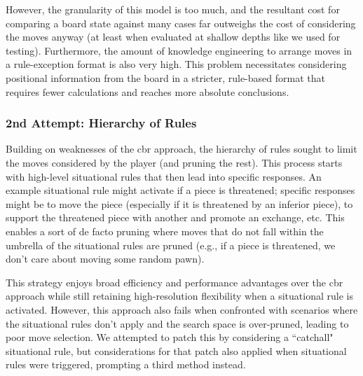 \documentclass[letterpaper]{article}
\begin{document}
However, the granularity of this model is too much, and the resultant cost for comparing a board state against many cases far outweighs the cost of considering the moves anyway (at least when evaluated at shallow depths like we used for testing).  Furthermore, the amount of knowledge engineering to arrange moves in a rule-exception format is also very high.  This problem necessitates considering positional information from the board in a stricter, rule-based format that requires fewer calculations and reaches more absolute conclusions.

\subsubsection{2nd Attempt: Hierarchy of Rules}
Building on weaknesses of the \acrshort{cbr} approach, the hierarchy of rules sought to limit the moves considered by the player (and pruning the rest).  This process starts with high-level situational rules that then lead into specific responses.  An example situational rule might activate if a piece is threatened; specific responses might be to move the piece (especially if it is threatened by an inferior piece), to support the threatened piece with another and promote an exchange, etc.  This enables a sort of de facto pruning where moves that do not fall within the umbrella of the situational rules are pruned (e.g., if a piece is threatened, we don't care about moving some random pawn).

This strategy enjoys broad efficiency and performance advantages over the \acrshort{cbr} approach while still retaining high-resolution flexibility when a situational rule is activated.  However, this approach also fails when confronted with scenarios where the situational rules don't apply and the search space is over-pruned, leading to poor move selection.  We attempted to patch this by considering a ``catchall" situational rule, but considerations for that patch also applied when situational rules were triggered, prompting a third method instead.
\end{document}

